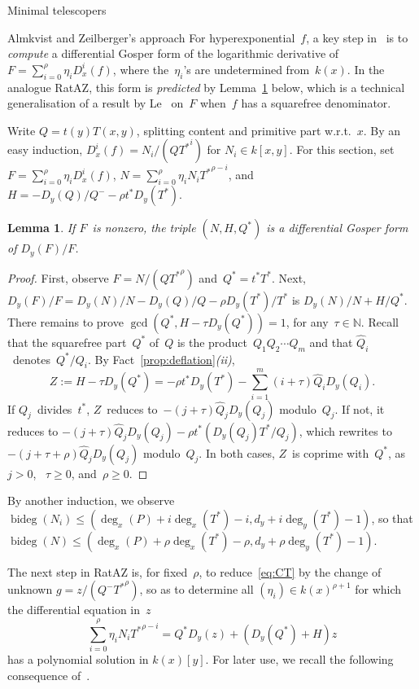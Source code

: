 \documentclass{sig-alt-full}
\newcommand{\bideg}{\operatorname{bideg}}
\newcommand{\bN}{\mathbb{N}}
\newtheorem{lemma}{Lemma}
\begin{document}
\begin{section}{Minimal telescopers}
\begin{subsection}{Almkvist and Zeilberger's approach}
For hyperexponential~$f$, a key step in~\cite{Almkvist1990} is to
\emph{compute\/} a differential Gosper form of the logarithmic derivative of
$F=\sum_{i=0}^{\rho} \eta_iD_x^i(f)$, where the~$\eta_i$'s are
undetermined from~$k(x)$.
In the analogue \textsf{RatAZ}, this form is \emph{predicted\/} by
Lemma~\ref{le:dGf-for-F'/F} below, which is a technical
generalisation of a result by Le~\cite{Le2000} on~$F$ when~$f$ has a
squarefree denominator.

Write $Q=t(y)T(x,y)$, splitting content and primitive part
w.r.t.~$x$.
By an easy induction, $D_x^i(f)=N_i/(Q{T^*}^i)$ for $N_i\in k[x, y]$.
For this section, set $F=\sum_{i=0}^{\rho} \eta_iD_x^i(f)$, $N=\sum_{i=0}^{\rho}\eta_iN_i{T^*}^{\rho-i}$, and
$H=-D_y(Q)/Q^--\rho t^*D_y(T^*)$.

\begin{lemma}\label{le:dGf-for-F'/F}
If $F$~is nonzero,
the triple $(N, H, Q^*)$ is a differential Gosper form of $D_y(F)/F$.
\end{lemma}

\begin{proof}
First, observe $F=N/(Q{T^*}^\rho)$ and~$Q^*=t^*T^*$.
Next, $D_y(F)/F = D_y(N)/N - D_y(Q)/Q - \rho D_y(T^*)/T^*$ is
$D_y(N)/N + H/Q^*$.
There remains to prove $\gcd(Q^*, H - \tau D_y(Q^*)) = 1$, for
any~$\tau \in \bN$.
Recall that the squarefree part~$Q^*$ of~$Q$ is the product~$Q_1Q_2\cdots Q_m$
and that $\hat{Q}_i$~denotes~$Q^*/Q_i$.
By Fact~\ref{prop:deflation}\emph{(ii)},
\begin{equation*}
Z := H - \tau D_y(Q^*)
  = -\rho t^*D_y(T^*)-\sum_{i=1}^m(i+\tau)\hat Q_iD_y(Q_i) .
\end{equation*}
If $Q_j$~divides~$t^*$, $Z$~reduces to~$-(j+\tau)\hat Q_jD_y(Q_j)$ modulo~$Q_j$.
If not, it reduces to $-(j+\tau)\hat Q_jD_y(Q_j) -\rho
t^*(D_y(Q_j)T^*/Q_j)$,
which rewrites to~$-(j+\tau+\rho)\hat Q_jD_y(Q_j)$ modulo~$Q_j$.
In both cases, $Z$~is coprime with~$Q^*$, as $j>0$, \ $\tau\geq0$,
and~$\rho\geq0$.
\end{proof}

By another induction, we observe
$\bideg(N_i) \le (\deg_x(P)+i \deg_x(T^*)-i, d_y+i \deg_y(T^*)-1)$,
so that
$\bideg(N) \le (\deg_x(P)+\rho \deg_x(T^*)-\rho, d_y+\rho \deg_y(T^*)-1)$.

The next step in \textsf{RatAZ} is, for fixed~$\rho$, to reduce~\eqref{eq:CT}
by the change of unknown $g=z/(Q^-{T^*}^\rho)$, so as to determine all
$(\eta_i)\in k(x)^{\rho+1}$ for which the differential equation in~$z$
\begin{equation}\label{eq:pdga}
\sum_{i=0}^{\rho}\eta_iN_i{T^*}^{\rho-i}=Q^*D_y(z)+\left(D_y(Q^*)+H\right)z
\end{equation}
has a polynomial solution in $k(x)[y]$.
For later use, we recall the following consequence
of~\cite[Corollary 9.6]{Gerhard2004}.


\end{subsection}
\end{section}
\end{document}
